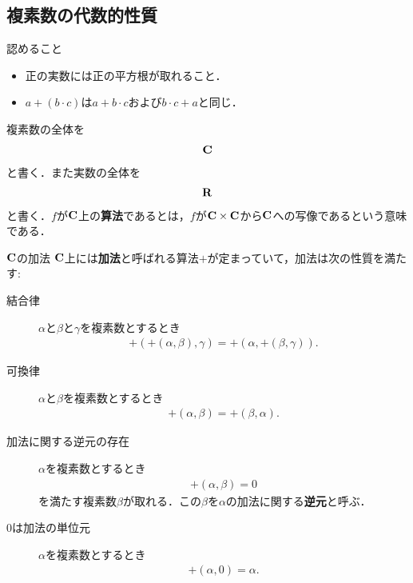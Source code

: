 \subsection{複素数の代数的性質}
	\begin{itembox}[l]{認めること}
		\begin{itemize}
			\item 正の実数には正の平方根が取れること．
			\item $a + (b \cdot c)$は$a + b \cdot c$および$b \cdot c + a$と同じ．
		\end{itemize}
	\end{itembox}
	
	複素数の全体を
	\begin{align}
		\mathbf{C}
	\end{align}
	と書く．また実数の全体を
	\begin{align}
		\mathbf{R}
	\end{align}
	と書く．$f$が$\mathbf{C}$上の{\bf 算法}であるとは，$f$が$\mathbf{C} \times \mathbf{C}$から$\mathbf{C}$への写像であるという意味である．
	
	\begin{itembox}[l]{$\mathbf{C}$の加法}
		$\mathbf{C}$上には{\bf 加法}と呼ばれる算法$+$が定まっていて，加法は次の性質を満たす:
		\begin{description}
			\item[結合律] $\alpha$と$\beta$と$\gamma$を複素数とするとき
				\begin{align}
					+\left(+(\alpha,\beta),\gamma\right) = +\left(\alpha,+(\beta,\gamma)\right).
				\end{align}
				
			\item[可換律]  $\alpha$と$\beta$を複素数とするとき
				\begin{align}
					+(\alpha,\beta) = +(\beta,\alpha).
				\end{align}
				
			\item[加法に関する逆元の存在] $\alpha$を複素数とするとき
				\begin{align}
					+(\alpha,\beta) = 0
				\end{align}
				を満たす複素数$\beta$が取れる．この$\beta$を$\alpha$の加法に関する{\bf 逆元}と呼ぶ．
				
			\item[$0$は加法の単位元] $\alpha$を複素数とするとき
				\begin{align}
					+(\alpha,0) = \alpha.
				\end{align}
		\end{description}
	\end{itembox}
	
